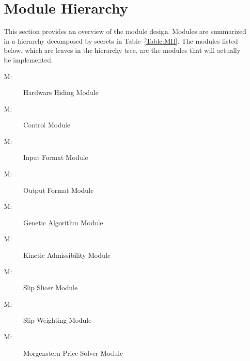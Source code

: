 \documentclass[12pt]{article}
\newcounter{modnum}
\newcommand{\mthemodnum}{M\themodnum}
\begin{document}
\section{Module Hierarchy}
\label{Sec:MH}
This section provides an overview of the module design. Modules are summarized in a hierarchy decomposed by secrets in Table~\ref{Table:MH}. The modules listed below, which are leaves in the hierarchy tree, are the modules that will actually be implemented.
\begin{description}
\item[\mthemodnum\label{Mhardwarehiding}:]Hardware Hiding Module
\end{description}
\begin{description}
\item[\mthemodnum\label{Mcontrol}:]Control Module
\end{description}
\begin{description}
\item[\mthemodnum\label{Minputformat}:]Input Format Module
\end{description}
\begin{description}
\item[\mthemodnum\label{Moutputformat}:]Output Format Module
\end{description}
\begin{description}
\item[\mthemodnum\label{Mgeneticalgorithm}:]Genetic Algorithm Module
\end{description}
\begin{description}
\item[\mthemodnum\label{Mkineticadmissibility}:]Kinetic Admissibility Module
\end{description}
\begin{description}
\item[\mthemodnum\label{Mslipslicer}:]Slip Slicer Module
\end{description}
\begin{description}
\item[\mthemodnum\label{Mslipweighting}:]Slip Weighting Module
\end{description}
\begin{description}
\item[\mthemodnum\label{Mmorgensternpricesolver}:]Morgenstern Price Solver Module
\end{description}
\end{document}
